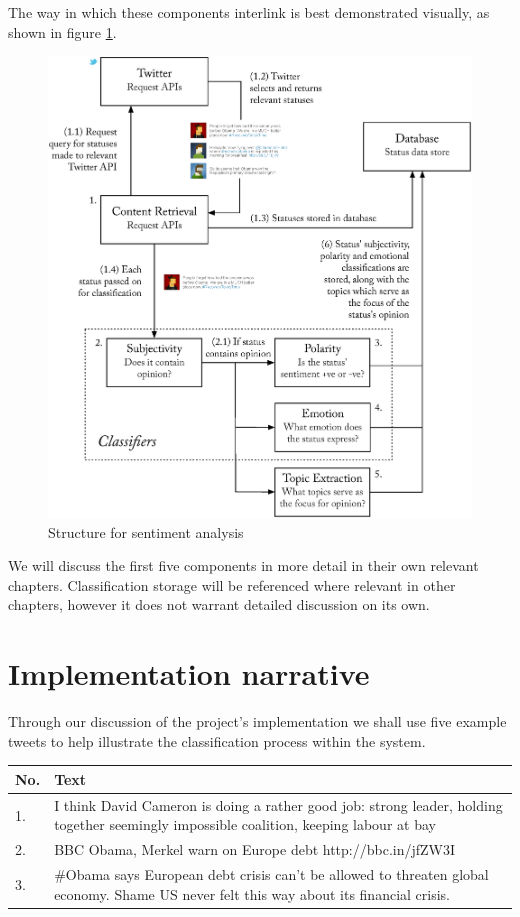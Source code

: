 The way in which these components interlink is best demonstrated visually, as shown in figure \ref{fig:outline_diagram}.

\begin{figure}[h!]
	\caption{Structure for sentiment analysis}
	\label{fig:outline_diagram}
	\centering
		\includegraphics[width=1\textwidth]{figures/outline.eps}
\end{figure}

We will discuss the first five components in more detail in their own relevant chapters. Classification storage will be referenced where relevant in other chapters, however it does not warrant detailed discussion on its own. 

\section{Implementation narrative}

Through our discussion of the project's implementation we shall use five example tweets to help illustrate the classification process within the system. 

\begin{tabular}{ | l | p{4in} | }
	\hline
	No. & Text \\
	\hline
	1. & I think David Cameron is doing a rather good job: strong leader, holding together seemingly impossible coalition, keeping labour at bay \\ %
	2. & BBC Obama, Merkel warn on Europe debt http://bbc.in/jfZW3I \\ %
	3. & \#Obama says European debt crisis can't be allowed to threaten global economy. Shame US never felt this way about its financial crisis. \\ %
	\hline
\end{tabular}






